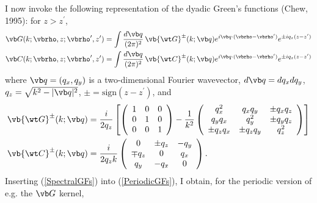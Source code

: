 \documentclass[letterpaper]{article}
\begin{document}
I now invoke the following representation of the dyadic
Green's functions (Chew, 1995): for $z>z^\prime$,
\begin{subequations}
\begin{align}
 \vb G(k; \vbrho, z; \vbrho^\prime, z^\prime)
&= \int \frac{d\vb q}{(2\pi)^2}
   \,
   \vb{\wt G}^\pm (k; \vb q)
      e^{i\vb q\cdot (\vbrho-\vbrho^\prime)}
     e^{\pm iq_z(z-z^\prime)}
\\
 \vb C(k; \vbrho, z; \vbrho^\prime, z^\prime)
&=\int \frac{d\vb q}{(2\pi)^2}
  \, 
  \vb{\wt C}^\pm (k; \vb q) e^{i\vb q\cdot (\vbrho-\vbrho^\prime)}
                   e^{\pm iq_z(z-z^\prime)}
\end{align}
\label{SpectralGFs}%
\end{subequations}
where $\vb q=(q_x,q_y)$ is a two-dimensional Fourier wavevector,
$d\vb q=dq_x dq_y$,
$q_z=\sqrt{k^2-|\vb q|^2}$, $\pm = \text{sign}(z-z^\prime)$,
and
\begin{align*}
 \vb{\wt G}^\pm(k; \vb q)
   &=\frac{i}{2 q_z}
     \left[
     \left(\begin{array}{ccc}
      1 & 0 & 0 \\ 
      0 & 1 & 0 \\ 
      0 & 0 & 1
     \end{array}\right)
     -\frac{1}{k^2}
     \left(\begin{array}{ccc}
      q_x^2       & q_x q_y     & \pm q_x q_z \\
      q_yq_x      & q_y^2       & \pm q_y q_z \\
      \pm q_z q_x & \pm q_z q_y & q_z^2
     \end{array}\right)\right]
\\
 \vb{\wt C}^\pm (k; \vb q)
   &=\frac{i}{2q_z k}
     \left(\begin{array}{ccc}
           0 & \pm q_z & -q_y \\
     \mp q_z &       0 &  q_x \\
         q_y &    -q_x &    0
     \end{array}\right).
\end{align*}
Inserting (\ref{SpectralGFs}) into (\ref{PeriodicGFs}), I 
obtain, for the periodic version of e.g. the $\vb G$ kernel,
\end{document}

